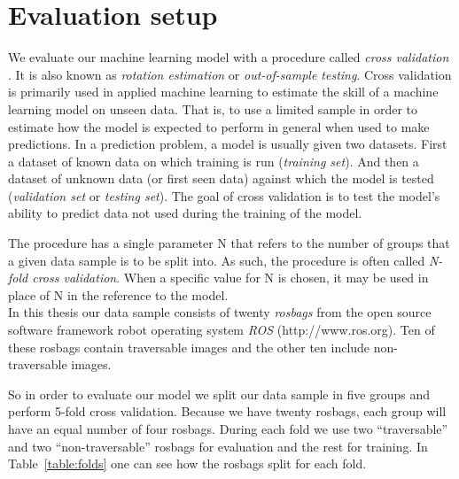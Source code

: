 \documentclass[12pt,a4paper]{report}
\newcommand{\alleg}{\enquote}
\newcommand{\term}{\textit}
\newcommand{\acronym}{\MakeUppercase}
\begin{document}
	\section{Evaluation setup}
	\label{sec:exp:eval}
	
	We evaluate our machine learning model with a procedure called \term{cross validation} 
	\citep{Brownlee}. It is also known as \term{rotation estimation} or \term{out-of-sample 
	testing}. Cross validation is primarily used in applied machine learning to estimate 
	the skill of a machine learning model on unseen data. That is, to use a limited sample 
	in order to estimate how the model is expected to perform in general when used to make 
	predictions. In a prediction problem, a model is usually given two datasets. First a 
	dataset of known data on which training is run (\term{training set}). And then a dataset 
	of unknown data (or first seen data) against which the model is tested (\term{validation 
	set} or \term{testing set}). The goal of cross validation is to test the model's ability 
	to predict data not used during the training of the model.
	\par
	The procedure has a single parameter N that refers to the number of groups that a given 
	data sample is to be split into. As such, the procedure is often called \term{N-fold 
	cross validation}. When a specific value for N is chosen, it may be used in place of N 
	in the reference to the model. 
	\\
	
	In this thesis our data sample consists of twenty \term{rosbags} from the open source 
	software framework robot operating system \term{\acronym{ros}} (http://www.ros.org). 
	Ten of these rosbags contain traversable images and the other ten include non-traversable 
	images.
	\par
	So in order to evaluate our model we split our data sample in five groups and perform 
	5-fold cross validation. Because we have twenty rosbags, each group will have an equal 
	number of four rosbags. During each fold we use two \alleg{traversable} and two 
	\alleg{non-traversable} rosbags for evaluation and the rest for training. In 
	Table~\ref{table:folds} one can see how the rosbags split for each fold.
	\\
	
\end{document}

